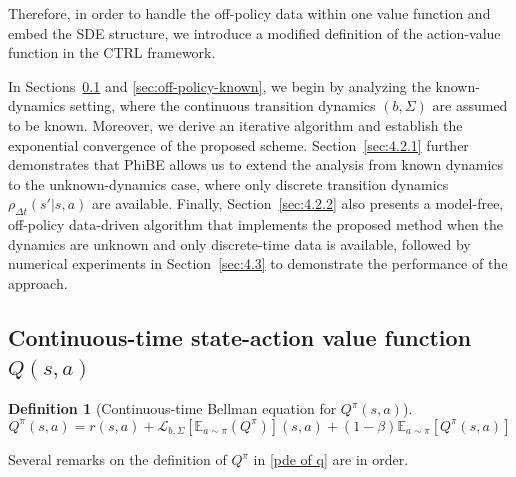 \documentclass[12pt]{article}
\newtheorem{definition}{Definition}
\def\E{\mathbb E}
\def\mL{\mathcal{L}_{b,\Sigma}}
\def\l{\left}
\def\r{\right}
\def\nb{\nabla}
\begin{document}
Therefore, in order to handle the off-policy data within one value function and embed the SDE structure, we introduce a modified definition of the action-value function in the CTRL framework.





In Sections~\ref{sec:4.1.1} and \ref{sec:off-policy-known}, we begin by analyzing the known-dynamics setting, where the continuous transition dynamics $(b, \Sigma)$ are assumed to be known. Moreover, we derive an iterative algorithm and establish the exponential convergence of the proposed scheme. Section~\ref{sec:4.2.1} further demonstrates that PhiBE allows us to extend the analysis from known dynamics to the unknown-dynamics case, where only discrete transition dynamics $\rho_{\Delta t}(s'|s,a)$ are available. Finally, Section~\ref{sec:4.2.2} also presents a model-free, off-policy data-driven algorithm that implements the proposed method when the dynamics are unknown and only discrete-time data is available, followed by numerical experiments in Section~\ref{sec:4.3} to demonstrate the performance of the approach.


\subsection{Continuous-time state-action value function $Q(s,a)$}\label{sec:4.1.1}
\begin{definition}[Continuous-time Bellman equation for $Q^\pi(s,a)$]\label{def of Q-pi}
\begin{equation}\label{pde of q}
Q^\pi(s,a) = r(s,a) + \mL \l[\E_{a\sim\pi} (Q^\pi)\r](s,a) + (1-\beta) \E_{a\sim\pi} [Q^\pi(s,a)]
\end{equation}

\end{definition}
Several remarks on the definition of $Q^\pi$ in \eqref{pde of q} are in order.
\end{document}
